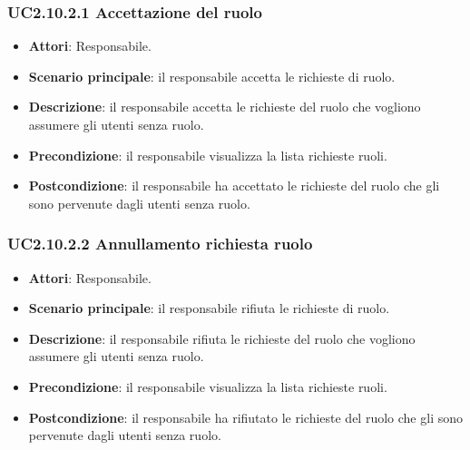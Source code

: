 \subsubsection{UC2.10.2.1 Accettazione del ruolo}
\begin{itemize}
\item \textbf{Attori}: Responsabile.
\item \textbf{Scenario principale}: il responsabile accetta le richieste di ruolo.
\item \textbf{Descrizione}: il responsabile accetta  le richieste del ruolo che vogliono assumere gli utenti senza ruolo.
\item \textbf{Precondizione}: il responsabile visualizza la lista richieste ruoli.
\item \textbf{Postcondizione}: il responsabile ha accettato le richieste del ruolo che gli sono pervenute dagli utenti senza ruolo.
\end{itemize}
\subsubsection{UC2.10.2.2 Annullamento richiesta ruolo}
\begin{itemize}
\item \textbf{Attori}: Responsabile.
\item \textbf{Scenario principale}: il responsabile rifiuta le richieste di ruolo.
\item \textbf{Descrizione}: il responsabile rifiuta le richieste  del ruolo che vogliono assumere gli utenti senza ruolo.
\item \textbf{Precondizione}: il responsabile visualizza la lista richieste ruoli.
\item \textbf{Postcondizione}: il responsabile ha rifiutato le richieste del ruolo che gli sono pervenute dagli utenti senza ruolo.
\end{itemize}
